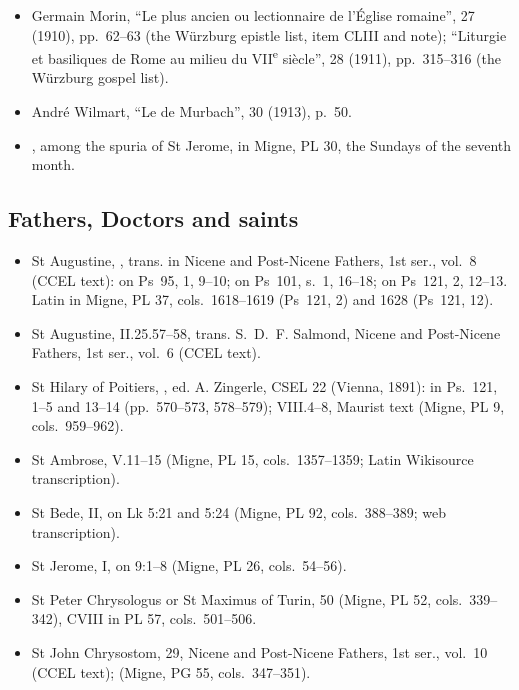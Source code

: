 {\begin{itemize}
\item Germain Morin, ``Le plus ancien  ou lectionnaire de l'Église romaine'',  27 (1910), pp.~62--63 (the Würzburg epistle list, item CLIII and note); ``Liturgie et basiliques de Rome au milieu du VII\textsuperscript{e} siècle'',  28 (1911), pp.~315--316 (the Würzburg gospel list).
\item André Wilmart, ``Le  de Murbach'',  30 (1913), p.~50.
\item {}, among the spuria of St Jerome, in Migne, PL 30, the Sundays of the seventh month.
\end{itemize}

\subsection*{Fathers, Doctors and saints}
\begin{itemize}
\item St Augustine, , trans. in Nicene and Post-Nicene Fathers, 1st ser., vol.~8 (CCEL text): on Ps~95, 1, 9--10; on Ps~101, s.~1, 16--18; on Ps~121, 2, 12--13. Latin in Migne, PL 37, cols.~1618--1619 (Ps~121, 2) and 1628 (Ps~121, 12).
\item St Augustine,  II.25.57--58, trans. S.~D.~F. Salmond, Nicene and Post-Nicene Fathers, 1st ser., vol.~6 (CCEL text).
\item St Hilary of Poitiers, , ed. A. Zingerle, CSEL 22 (Vienna, 1891): in Ps.~121, 1--5 and 13--14 (pp.~570--573, 578--579);  VIII.4--8, Maurist text (Migne, PL 9, cols.~959--962).
\item St Ambrose,  V.11--15 (Migne, PL 15, cols.~1357--1359; Latin Wikisource transcription).
\item St Bede,  II, on Lk 5:21 and 5:24 (Migne, PL 92, cols.~388--389; web transcription).
\item St Jerome,  I, on 9:1--8 (Migne, PL 26, cols.~54--56).
\item St Peter Chrysologus or St Maximus of Turin,  50 (Migne, PL 52, cols.~339--342),  CVIII in PL 57, cols.~501--506.
\item St John Chrysostom,  29, Nicene and Post-Nicene Fathers, 1st ser., vol.~10 (CCEL text);  (Migne, PG 55, cols.~347--351).

\end{itemize}}
